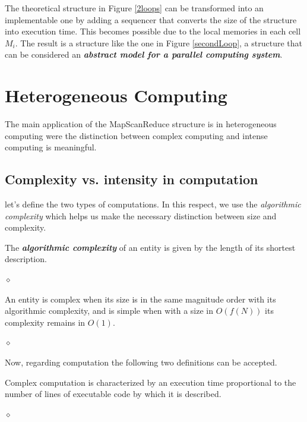 The theoretical structure in Figure \ref{2loops} can be transformed into an implementable one by adding a sequencer that converts the size of the structure into execution time. This becomes possible due to the local memories in each cell $M_i$. The result is a structure like the one in Figure \ref{secondLoop}, a structure that can be considered an {\bf {\em abstract model for a parallel computing system}}.


\section{Heterogeneous Computing}

The main application of the MapScanReduce structure is in heterogeneous computing were the distinction between complex computing and intense computing is meaningful.

\subsection{Complexity vs. intensity in computation}

let's define the two types of computations. In this respect, we use the {\em algorithmic complexity} \cite{Chaitin70} which helps us make the necessary distinction between size and complexity.

\begin{definition}
The {\bf {\em algorithmic complexity}} of an entity is given by the length of its shortest description.

$\diamond$
\end{definition}

\begin{definition}
An entity is complex when its size is in the same magnitude order with its algorithmic complexity, and is simple when with a size in $O(f(N))$ its complexity remains in $O(1)$.

$\diamond$
\end{definition}

Now, regarding computation the following two definitions can be accepted.

\begin{definition}
Complex computation is characterized by an execution time proportional to the number of lines of executable code by which it is described.

$\diamond$
\end{definition}

